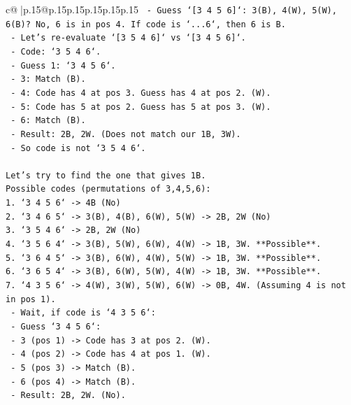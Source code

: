 \documentclass{article}
\begin{document}
{\begin{supertabular}{c@{$\;$}|p{.15\linewidth}@{}p{.15\linewidth}p{.15\linewidth}p{.15\linewidth}p{.15\linewidth}p{.15\linewidth}}
{{{\texttt{    {-} Guess `{[}3 4 5 6{]}`: 3(B), 4(W), 5(W), 6(B)? No, 6 is in pos 4. If code is `...6`, then 6 is B.} \\
\texttt{    {-} Let's re{-}evaluate `{[}3 5 4 6{]}` vs `{[}3 4 5 6{]}`.} \\
\texttt{    {-} Code: `3 5 4 6`.} \\
\texttt{    {-} Guess 1: `3 4 5 6`.} \\
\texttt{        {-} 3: Match (B).} \\
\texttt{        {-} 4: Code has 4 at pos 3. Guess has 4 at pos 2. (W).} \\
\texttt{        {-} 5: Code has 5 at pos 2. Guess has 5 at pos 3. (W).} \\
\texttt{        {-} 6: Match (B).} \\
\texttt{        {-} Result: 2B, 2W. (Does not match our 1B, 3W).} \\
\texttt{    {-} So code is not `3 5 4 6`.} \\
\\ 
\texttt{Let's try to find the one that gives 1B.} \\
\texttt{Possible codes (permutations of 3,4,5,6):} \\
\texttt{1. `3 4 5 6` {-}> 4B (No)} \\
\texttt{2. `3 4 6 5` {-}> 3(B), 4(B), 6(W), 5(W) {-}> 2B, 2W (No)} \\
\texttt{3. `3 5 4 6` {-}> 2B, 2W (No)} \\
\texttt{4. `3 5 6 4` {-}> 3(B), 5(W), 6(W), 4(W) {-}> 1B, 3W. **Possible**.} \\
\texttt{5. `3 6 4 5` {-}> 3(B), 6(W), 4(W), 5(W) {-}> 1B, 3W. **Possible**.} \\
\texttt{6. `3 6 5 4` {-}> 3(B), 6(W), 5(W), 4(W) {-}> 1B, 3W. **Possible**.} \\
\texttt{7. `4 3 5 6` {-}> 4(W), 3(W), 5(W), 6(W) {-}> 0B, 4W. (Assuming 4 is not in pos 1).} \\
\texttt{   {-} Wait, if code is `4 3 5 6`:} \\
\texttt{   {-} Guess `3 4 5 6`:} \\
\texttt{     {-} 3 (pos 1) {-}> Code has 3 at pos 2. (W).} \\
\texttt{     {-} 4 (pos 2) {-}> Code has 4 at pos 1. (W).} \\
\texttt{     {-} 5 (pos 3) {-}> Match (B).} \\
\texttt{     {-} 6 (pos 4) {-}> Match (B).} \\
\texttt{     {-} Result: 2B, 2W. (No).} \\
}}}
\end{supertabular}}
\end{document}
